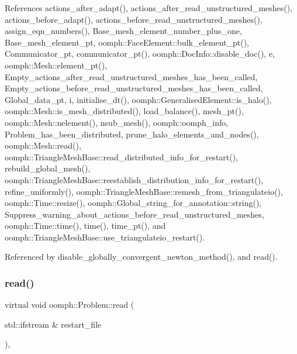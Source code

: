 References actions\+\_\+after\+\_\+adapt(), actions\+\_\+after\+\_\+read\+\_\+unstructured\+\_\+meshes(), actions\+\_\+before\+\_\+adapt(), actions\+\_\+before\+\_\+read\+\_\+unstructured\+\_\+meshes(), assign\+\_\+eqn\+\_\+numbers(), Base\+\_\+mesh\+\_\+element\+\_\+number\+\_\+plus\+\_\+one, Base\+\_\+mesh\+\_\+element\+\_\+pt, oomph\+::\+Face\+Element\+::bulk\+\_\+element\+\_\+pt(), Communicator\+\_\+pt, communicator\+\_\+pt(), oomph\+::\+Doc\+Info\+::disable\+\_\+doc(), e, oomph\+::\+Mesh\+::element\+\_\+pt(), Empty\+\_\+actions\+\_\+after\+\_\+read\+\_\+unstructured\+\_\+meshes\+\_\+has\+\_\+been\+\_\+called, Empty\+\_\+actions\+\_\+before\+\_\+read\+\_\+unstructured\+\_\+meshes\+\_\+has\+\_\+been\+\_\+called, Global\+\_\+data\+\_\+pt, i, initialise\+\_\+dt(), oomph\+::\+Generalised\+Element\+::is\+\_\+halo(), oomph\+::\+Mesh\+::is\+\_\+mesh\+\_\+distributed(), load\+\_\+balance(), mesh\+\_\+pt(), oomph\+::\+Mesh\+::nelement(), nsub\+\_\+mesh(), oomph\+::oomph\+\_\+info, Problem\+\_\+has\+\_\+been\+\_\+distributed, prune\+\_\+halo\+\_\+elements\+\_\+and\+\_\+nodes(), oomph\+::\+Mesh\+::read(), oomph\+::\+Triangle\+Mesh\+Base\+::read\+\_\+distributed\+\_\+info\+\_\+for\+\_\+restart(), rebuild\+\_\+global\+\_\+mesh(), oomph\+::\+Triangle\+Mesh\+Base\+::reestablish\+\_\+distribution\+\_\+info\+\_\+for\+\_\+restart(), refine\+\_\+uniformly(), oomph\+::\+Triangle\+Mesh\+Base\+::remesh\+\_\+from\+\_\+triangulateio(), oomph\+::\+Time\+::resize(), oomph\+::\+Global\+\_\+string\+\_\+for\+\_\+annotation\+::string(), Suppress\+\_\+warning\+\_\+about\+\_\+actions\+\_\+before\+\_\+read\+\_\+unstructured\+\_\+meshes, oomph\+::\+Time\+::time(), time(), time\+\_\+pt(), and oomph\+::\+Triangle\+Mesh\+Base\+::use\+\_\+triangulateio\+\_\+restart().



Referenced by disable\+\_\+globally\+\_\+convergent\+\_\+newton\+\_\+method(), and read().

\mbox{\label{classoomph_1_1Problem_a561320c1b8deb3540d260c6c2c5f4fb4}} 
\subsubsection{\texorpdfstring{read()}{read()}\hspace{0.1cm}{\footnotesize\ttfamily [2/2]}}
{\footnotesize\ttfamily virtual void oomph\+::\+Problem\+::read (\begin{DoxyParamCaption}\item[{std\+::ifstream \&}]{restart\+\_\+file }\end{DoxyParamCaption})\hspace{0.3cm}{\ttfamily [inline]}, {\ttfamily [virtual]}}



